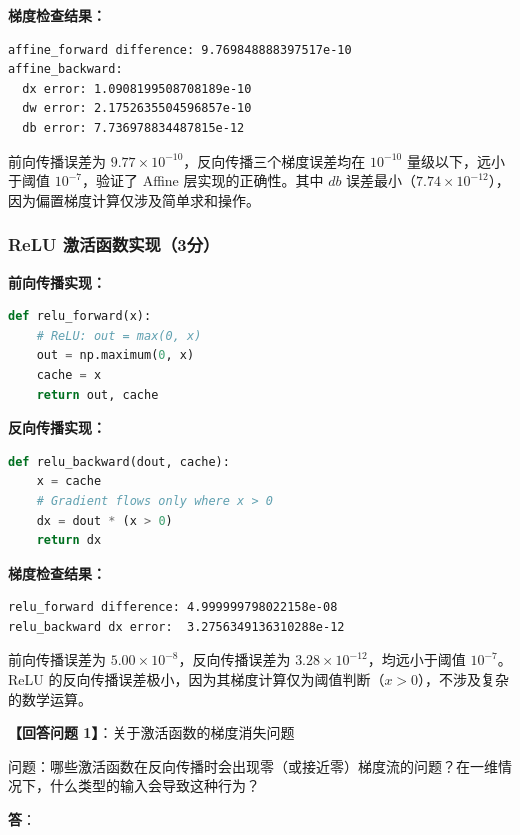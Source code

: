 \documentclass[a4paper]{article}
\begin{document}
\textbf{梯度检查结果：}

\begin{verbatim}
affine_forward difference: 9.769848888397517e-10
affine_backward:
  dx error: 1.0908199508708189e-10
  dw error: 2.1752635504596857e-10
  db error: 7.736978834487815e-12
\end{verbatim}

前向传播误差为 $9.77 \times 10^{-10}$，反向传播三个梯度误差均在 $10^{-10}$ 量级以下，远小于阈值 $10^{-7}$，验证了 Affine 层实现的正确性。其中 $db$ 误差最小（$7.74 \times 10^{-12}$），因为偏置梯度计算仅涉及简单求和操作。

\subsubsection{ReLU 激活函数实现（3分）}

\textbf{前向传播实现：}

\begin{lstlisting}[language=Python]
def relu_forward(x):
    # ReLU: out = max(0, x)
    out = np.maximum(0, x)
    cache = x
    return out, cache
\end{lstlisting}

\textbf{反向传播实现：}

\begin{lstlisting}[language=Python]
def relu_backward(dout, cache):
    x = cache
    # Gradient flows only where x > 0
    dx = dout * (x > 0)
    return dx
\end{lstlisting}

\textbf{梯度检查结果：}

\begin{verbatim}
relu_forward difference: 4.999999798022158e-08
relu_backward dx error:  3.2756349136310288e-12
\end{verbatim}

前向传播误差为 $5.00 \times 10^{-8}$，反向传播误差为 $3.28 \times 10^{-12}$，均远小于阈值 $10^{-7}$。ReLU 的反向传播误差极小，因为其梯度计算仅为阈值判断（$x > 0$），不涉及复杂的数学运算。

\textbf{【回答问题 1】}：关于激活函数的梯度消失问题

问题：哪些激活函数在反向传播时会出现零（或接近零）梯度流的问题？在一维情况下，什么类型的输入会导致这种行为？

\textbf{答}：
\end{document}
